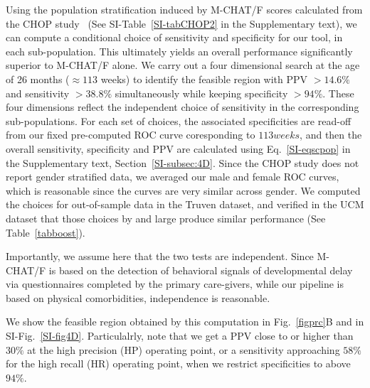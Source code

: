 \documentclass[onecolumn,,10pt]{IEEEtran}
\newcommand{\hil}[1]{{\color{Red1}\itshape #1}}
\begin{document}
%
Using the population stratification induced by M-CHAT/F scores  calculated from the CHOP study~\cite{pmid31562252} (See SI-Table~\ref{SI-tabCHOP2} in the Supplementary text), we can compute a conditional choice of sensitivity and specificity for our tool, in each sub-population. This ultimately yields an overall performance significantly  superior to  M-CHAT/F alone.
We carry out a four dimensional search at the age of 26 months ($\approx 113$ weeks) 
to  identify the feasible region with  PPV  $>14.6\%$ and sensitivity  $>38.8\%$ simultaneously while keeping specificity  $>94\%$. These four  dimensions reflect the independent choice of sensitivity in the corresponding sub-populations. For each set of  choices, the associated  specificities are read-off from our fixed pre-computed ROC curve coresponding to $113 weeks$, and then the overall sensitivity, specificity and PPV are calculated using Eq.~\eqref{SI-eqscpop} in the Supplementary text, Section~\ref{SI-subsec:4D}. Since the CHOP study does not report gender stratified data, we averaged our male and female ROC curves, which is reasonable since the curves are very similar across gender. We computed the choices for out-of-sample data in the Truven dataset, and verified in the UCM dataset that those choices by and large produce similar performance (See Table~\ref{tabboost}).

Importantly, we assume here that the two tests are independent.
Since M-CHAT/F is based on the detection of behavioral signals of developmental delay  via questionnaires completed by the primary care-givers, while our pipeline is based on  physical comorbidities, independence is reasonable. 
 
We show the feasible region obtained by this computation in Fig.~\ref{figprc}B and in SI-Fig.~\ref{SI-fig4D}. Particulalrly, note that we get a PPV close to or higher than $30\%$ at the high precision (HP) operating point, or a sensitivity approaching $ 58\%$ for the high recall (HR) operating point, when we restrict specificities to above $94\%$.
  
\end{document}
